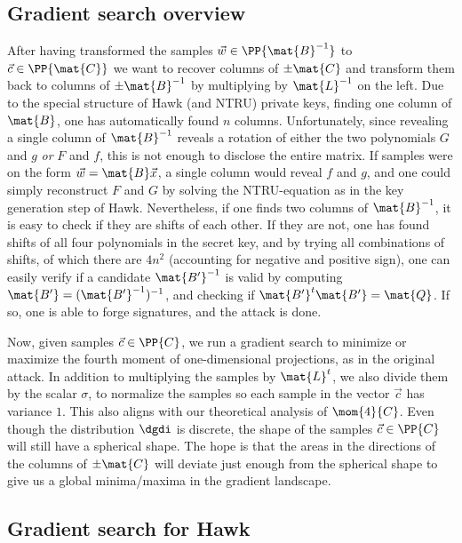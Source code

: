 \subsection{Gradient search overview}
After having transformed the samples $\vec{w} \in \PP{\mat{B}^{-1}}$ to $\vec{c} \in \PP{\mat{C}}$ we want to recover columns of $\pm \mat{C}$ and transform them back to columns of $\pm \mat{B}^{-1}$ by multiplying by $\mat{L}^{-1}$ on the left.
Due to the special structure of Hawk (and NTRU) private keys, finding one column of $\mat{B}$, one has automatically found $n$ columns.
Unfortunately, since revealing a single column of $ \mat{B}^{-1}$ reveals a rotation of either the two polynomials $G$ and $ g$ \textit{or} $F$ and $f$,
this is not enough to disclose the entire matrix. If samples were on the form $\vec{w} = \mat{B} \vec{x}$, a single column would reveal $f$ and $g$, and one could simply reconstruct $F$ and $G$
by solving the NTRU-equation as in the key generation step of Hawk.
Nevertheless, if one finds two columns of $\mat{B}^{-1}$, it is easy to check if they are shifts of each other. If they are not, one has found shifts of all four polynomials in the secret key, 
and by trying all combinations of shifts, of which there are $4 n^2$ (accounting for negative and positive sign), one can easily verify if a candidate $\mat{B'}^{-1}$ is valid by computing 
$\mat{B'} = (\mat{B'}^{-1})^{-1}$, and checking if $\mat{B'}^t \mat{B'} = \mat{Q}$. If so, one is able to forge signatures, and the attack is done.

Now, given samples $\vec{c} \in \PP{C}$, we run a gradient search to minimize or maximize the fourth moment of one-dimensional projections, as in the original attack. In addition to multiplying the samples by $\mat{L}^t$, we also divide them by the scalar $\sigma$, to normalize the samples
so each sample in the vector $\vec{c}$ has variance $1$. This also aligns with our theoretical analysis of $\mom{4}{C}$. Even though the distribution $\dgdi$ is discrete, the shape of the samples $\vec{c} \in \PP{C}$ will still have a spherical
shape. The hope is that the areas in the directions of the columns of $\pm \mat{C}$ will deviate just enough from the spherical shape to give us a global minima/maxima in the gradient landscape.

\subsection{Gradient search for Hawk}
